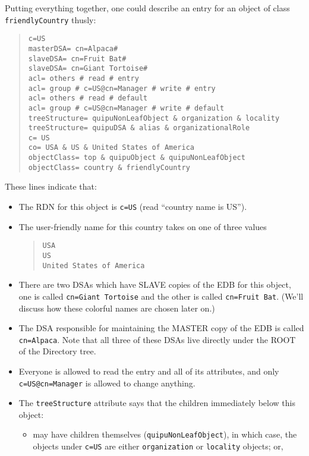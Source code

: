 Putting everything together,
one could describe an entry for an object of class \verb"friendlyCountry"
thusly:
\begin{quote}\small\begin{verbatim}
c=US
masterDSA= cn=Alpaca#
slaveDSA= cn=Fruit Bat#
slaveDSA= cn=Giant Tortoise# 
acl= others # read # entry
acl= group # c=US@cn=Manager # write # entry
acl= others # read # default
acl= group # c=US@cn=Manager # write # default
treeStructure= quipuNonLeafObject & organization & locality
treeStructure= quipuDSA & alias & organizationalRole
c= US
co= USA & US & United States of America
objectClass= top & quipuObject & quipuNonLeafObject
objectClass= country & friendlyCountry
\end{verbatim}\end{quote}
These lines indicate that:
\begin{itemize}
\item	The RDN for this object is \verb"c=US"
	(read ``country name is US'').

\item	The user-friendly name for this country takes on one of three values
\begin{quote}\small\begin{verbatim}
USA
US
United States of America
\end{verbatim}\end{quote}

\item	There are two DSAs which have SLAVE copies of the EDB for this
	object, one is called \verb"cn=Giant Tortoise" and the other
	is called \verb"cn=Fruit Bat".
	(We'll discuss how these colorful names are chosen later on.)

\item	The DSA responsible for maintaining the MASTER copy of the EDB
	is called \verb"cn=Alpaca".
	Note that all three of these DSAs live directly under the ROOT of
	the Directory tree.

\item	Everyone is allowed to read the entry and all of its attributes,
	and only \verb"c=US@cn=Manager" is allowed to change anything.

\item	The \verb"treeStructure" attribute says that the children immediately
	below this object:
    \begin{itemize}
     \item	may have children themselves (\verb"quipuNonLeafObject"),
		in which case, the objects under \verb"c=US" are either
		\verb"organization" or \verb"locality" objects; or,


\end{itemize}
\end{itemize}
